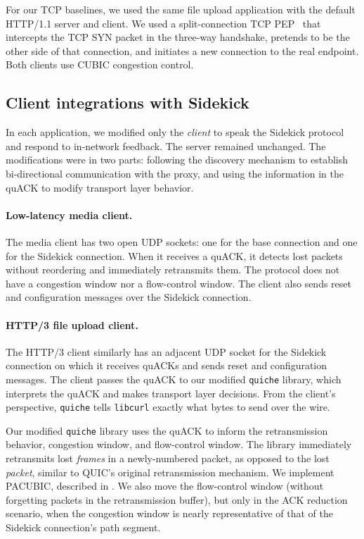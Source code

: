 For our TCP baselines, we used the same file upload application with the
default HTTP/1.1 server and client. We used a split-connection
TCP PEP~\cite{caini2006pepsal} that intercepts the TCP
SYN packet in the three-way handshake, pretends to be the other side of that
connection, and initiates a new connection to the real endpoint.
Both clients use CUBIC congestion control.

\subsection{Client integrations with Sidekick}
\label{sec:sidekick:implementation:client-integrations}

In each application, we modified only the \emph{client} to speak the Sidekick
protocol and respond to in-network feedback. The server remained unchanged.
The modifications were in two parts: following the discovery mechanism to
establish bi-directional communication with the proxy, and using the information
in the quACK to modify transport layer behavior.



\paragraph{Low-latency media client.} The media client has two open UDP sockets:
one for the base connection and one for the Sidekick connection. When it receives a
quACK, it detects lost packets without reordering and immediately retransmits
them. The protocol does not have a congestion window nor a flow-control window.
The client also sends reset and configuration messages over the Sidekick connection.

\paragraph{HTTP/3 file upload client.}
The HTTP/3 client similarly has an adjacent UDP socket for the Sidekick connection on
which it receives quACKs and sends reset and configuration messages. The client
passes the quACK to our modified \texttt{quiche} library, which interprets the
quACK and makes transport layer decisions. From the client's perspective,
\texttt{quiche} tells \texttt{libcurl} exactly what bytes to send over the wire.

Our modified \texttt{quiche} library uses the quACK to inform the
retransmission behavior, congestion window, and flow-control window. The library
immediately retransmits lost \emph{frames} in a newly-numbered
packet, as opposed to the lost \emph{packet}, similar to QUIC's original
retransmission mechanism. We implement PACUBIC,
described in .
We also move the flow-control window (without forgetting packets in the
retransmission buffer), but only in the ACK reduction scenario, when the
congestion window is nearly representative of that of the Sidekick connection's
path segment.

